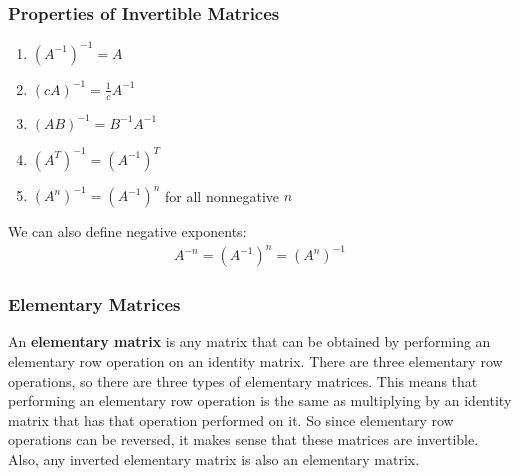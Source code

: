 \documentclass{article}
\begin{document}
\subsubsection{Properties of Invertible Matrices}
\begin{enumerate}
    \item $(A^{-1})^{-1} = A$
    \item $(cA)^{-1} = \frac{1}{c}A^{-1}$
    \item $(AB)^{-1} = B^{-1}A^{-1}$
    \item $(A^T)^{-1} = (A^{-1})^T$
    \item $(A^n)^{-1} = (A^{-1})^n$ for all nonnegative $n$
\end{enumerate}
We can also define negative exponents:
\begin{gather*}
    A^{-n} = (A^{-1})^n = (A^n)^{-1}
\end{gather*}
\subsubsection{Elementary Matrices}
An \textbf{elementary matrix} is any matrix that can be obtained by performing an elementary row operation on an identity matrix. There are three elementary row operations, so there are three types of elementary matrices. This means that performing an elementary row operation is the same as multiplying by an identity matrix that has that operation performed on it. So since elementary row operations can be reversed, it makes sense that these matrices are invertible. Also, any inverted elementary matrix is also an elementary matrix.
\end{document}
